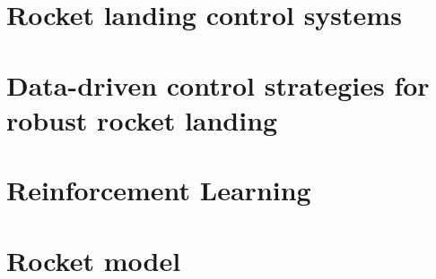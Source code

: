 

\section{Rocket landing control systems}
\label{sec:landing_control}


\section{Data-driven control strategies for robust rocket landing}
\label{sec:ICS}


\section{Reinforcement Learning}
\label{sec:RL}


\section{Rocket model}
\label{sec:RocketModel}
